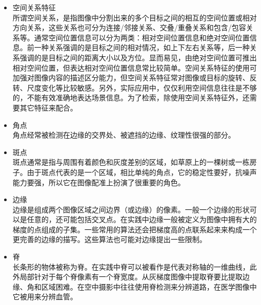 \begin{itemize}
\item 空间关系特征\\所谓空间关系，是指图像中分割出来的多个目标之间的相互的空间位置或相对方向关系，这些关系也可分为连接/邻接关系、交叠/重叠关系和包含/包容关系等。通常空间位置信息可以分为两类：相对空间位置信息和绝对空间位置信息。前一种关系强调的是目标之间的相对情况，如上下左右关系等，后一种关系强调的是目标之间的距离大小以及方位。显而易见，由绝对空间位置可推出相对空间位置，但表达相对空间位置信息常比较简单。空间关系特征的使用可加强对图像内容的描述区分能力，但空间关系特征常对图像或目标的旋转、反转、尺度变化等比较敏感。另外，实际应用中，仅仅利用空间信息往往是不够的，不能有效准确地表达场景信息。为了检索，除使用空间关系特征外，还需要其它特征来配合。
\item 角点 \\角点经常被检测在边缘的交界处、被遮挡的边缘、纹理性很强的部分。
\item 斑点\\斑点通常是指与周围有着颜色和灰度差别的区域，如草原上的一棵树或一栋房子。由于斑点代表的是一个区域，相比单纯的角点，它的稳定性要好，抗噪声能力要强，所以它在图像配准上扮演了很重要的角色。
\item 边缘 \\边缘是组成两个图像区域之间边界（或边缘）的像素。一般一个边缘的形状可以是任意的，还可能包括交叉点。在实践中边缘一般被定义为图像中拥有大的梯度的点组成的子集。一些常用的算法还会把梯度高的点联系起来来构成一个更完善的边缘的描写。这些算法也可能对边缘提出一些限制。
\item 脊 \\长条形的物体被称为脊。在实践中脊可以被看作是代表对称轴的一维曲线，此外局部针对于每个脊像素有一个脊宽度。从灰梯度图像中提取脊要比提取边缘、角和区域困难。在空中摄影中往往使用脊检测来分辨道路，在医学图像中它被用来分辨血管。
\end{itemize}
